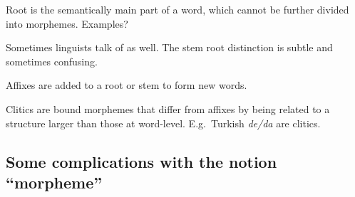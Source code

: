 \documentclass[11pt]{article}
\begin{document}
{\item Root is the semantically main part of a word, which cannot be further
divided into morphemes. Examples?

\item Sometimes linguists talk of  as well. The stem root
distinction is subtle and sometimes confusing. 

\item Affixes are added to a root or stem to form new words. 

\item Clitics are bound morphemes that differ from affixes by being related to a
structure larger than those at word-level. E.g.\ Turkish \emph{de/da} are clitics. 

}

\subsection{Some complications with the notion ``morpheme''}
\end{document}

